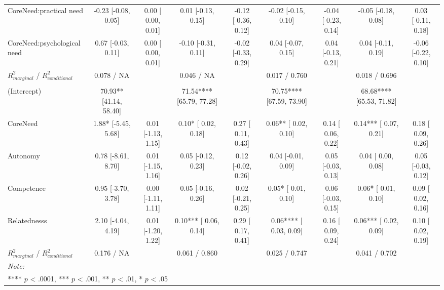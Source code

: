 \begin{table}
\begin{minipage}[t][\textheight][t]{\textwidth}
{\begin{tabular}[t]{lcccccccc}
\hspace{1em}CoreNeed:practical need & -0.23 [-0.08,  0.05] & 0.00 [ 0.00, 0.01] & 0.01 [-0.13,  0.15] & -0.12 [-0.36, 0.12] & -0.02 [-0.15,  0.10] & -0.04 [-0.23, 0.14] & -0.05 [-0.18,  0.08] & 0.03 [-0.11, 0.18]\\
\hspace{1em}CoreNeed:psychological need & 0.67 [-0.03,  0.11] & 0.00 [ 0.00, 0.01] & -0.10 [-0.31,  0.11] & -0.02 [-0.33, 0.29] & 0.04 [-0.07,  0.15] & 0.04 [-0.13, 0.21] & 0.04 [-0.11,  0.19] & -0.06 [-0.22, 0.10]\\
\hspace{1em}$R^2_{marginal}$ / $R^2_{conditional}$ & 0.078 / NA &  & 0.046 / NA &  & 0.017 / 0.760 &  & 0.018 / 0.696 & \\
\addlinespace[0.3em]
\multicolumn{9}{l}{\textbf{Specific Psychological Needs}}\\
\hspace{1em}(Intercept) & 70.93** [41.14, 58.40] &  & 71.54**** [65.79, 77.28] &  & 70.75**** [67.59, 73.90] &  & 68.68**** [65.53, 71.82] & \\
\hspace{1em}CoreNeed & 1.88* [-5.45,  5.68] & 0.01 [-1.13, 1.15] & 0.10* [ 0.02,  0.18] & 0.27 [ 0.11, 0.43] & 0.06** [ 0.02,  0.10] & 0.14 [ 0.06, 0.22] & 0.14*** [ 0.07,  0.21] & 0.18 [ 0.09, 0.26]\\
\hspace{1em}Autonomy & 0.78 [-8.61,  8.70] & 0.01 [-1.15, 1.16] & 0.05 [-0.12,  0.23] & 0.12 [-0.02, 0.26] & 0.04 [-0.01,  0.09] & 0.05 [-0.03, 0.13] & 0.04 [ 0.00,  0.08] & 0.05 [-0.03, 0.12]\\
\hspace{1em}Competence & 0.95 [-3.70,  3.78] & 0.00 [-1.11, 1.11] & 0.05 [-0.16,  0.26] & 0.02 [-0.21, 0.25] & 0.05* [ 0.01,  0.10] & 0.06 [-0.03, 0.15] & 0.06* [ 0.01,  0.10] & 0.09 [ 0.02, 0.16]\\
\hspace{1em}Relatednesss & 2.10 [-4.04,  4.19] & 0.01 [-1.20, 1.22] & 0.10*** [ 0.06,  0.14] & 0.29 [ 0.17, 0.41] & 0.06**** [ 0.03,  0.09] & 0.16 [ 0.09, 0.24] & 0.06*** [ 0.02,  0.09] & 0.10 [ 0.02, 0.19]\\
\hspace{1em}$R^2_{marginal}$ / $R^2_{conditional}$ & 0.176 / NA &  & 0.061 / 0.860 &  & 0.025 / 0.747 &  & 0.041 / 0.702 & \\
\bottomrule
\multicolumn{9}{l}{\rule{0pt}{1em}\textit{Note: }}\\
\multicolumn{9}{l}{\rule{0pt}{1em}**** $p$ < .0001, *** $p$ < .001, ** $p$ < .01, * $p$ < .05}\\
\end{tabular}}
\end{minipage}
\end{table}

